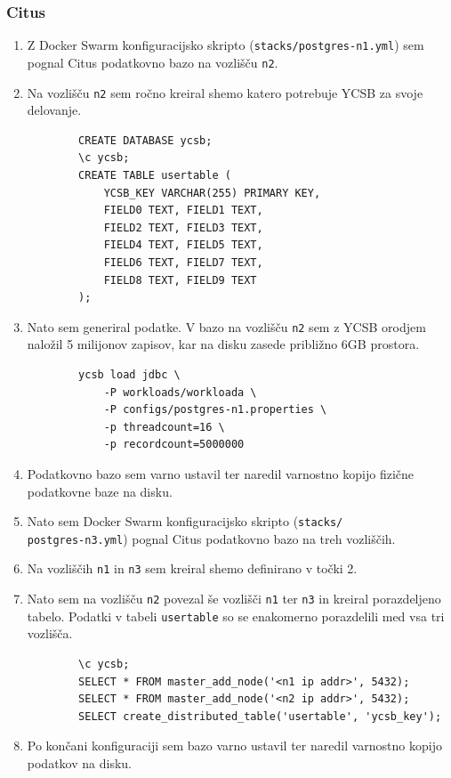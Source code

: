 \documentclass[a4paper, 12pt]{book}
\begin{document}
\subsubsection{Citus}
\begin{enumerate}
    \item Z Docker Swarm konfiguracijsko skripto (\texttt{stacks/postgres-n1.yml}) sem pognal Citus podatkovno bazo na vozlišču \texttt{n2}.
    \item Na vozlišču \texttt{n2} sem ročno kreiral shemo katero potrebuje YCSB za svoje delovanje.
    \begin{listing}[H]
    \begin{verbatim}
        CREATE DATABASE ycsb;
        \c ycsb;
        CREATE TABLE usertable (
            YCSB_KEY VARCHAR(255) PRIMARY KEY,
            FIELD0 TEXT, FIELD1 TEXT,
            FIELD2 TEXT, FIELD3 TEXT,
            FIELD4 TEXT, FIELD5 TEXT,
            FIELD6 TEXT, FIELD7 TEXT,
            FIELD8 TEXT, FIELD9 TEXT
        );
    \end{verbatim}
    \label{code-ycsb-schema-postgres}
    \end{listing}
    \item Nato sem generiral podatke. V bazo na vozlišču \texttt{n2} sem z YCSB orodjem naložil 5 milijonov zapisov, kar na disku zasede približno 6GB prostora.
    \begin{listing}[H]
    \begin{verbatim}
        ycsb load jdbc \
            -P workloads/workloada \
            -P configs/postgres-n1.properties \
            -p threadcount=16 \
            -p recordcount=5000000
    \end{verbatim}
    \label{code-ycsb-load-postgres}
    \end{listing}
    \item Podatkovno bazo sem varno ustavil ter naredil varnostno kopijo fizične podatkovne baze na disku.
    \item Nato sem Docker Swarm konfiguracijsko skripto (\texttt{stacks/\\postgres-n3.yml}) pognal Citus podatkovno bazo na treh vozliščih.
    \item Na vozliščih \texttt{n1} in \texttt{n3} sem kreiral shemo definirano v točki 2.
    \item Nato sem na vozlišču \texttt{n2} povezal še vozlišči \texttt{n1} ter \texttt{n3} in kreiral porazdeljeno tabelo. Podatki v tabeli \texttt{usertable} so se enakomerno porazdelili med vsa tri vozlišča.
    \begin{listing}[H]
    \begin{verbatim}
        \c ycsb;
        SELECT * FROM master_add_node('<n1 ip addr>', 5432);
        SELECT * FROM master_add_node('<n2 ip addr>', 5432);
        SELECT create_distributed_table('usertable', 'ycsb_key');
    \end{verbatim}
    \label{code-ycsb-add-node-citus}
    \end{listing}
    \item Po končani konfiguraciji sem bazo varno ustavil ter naredil varnostno kopijo podatkov na disku.
\end{enumerate}
\end{document}
